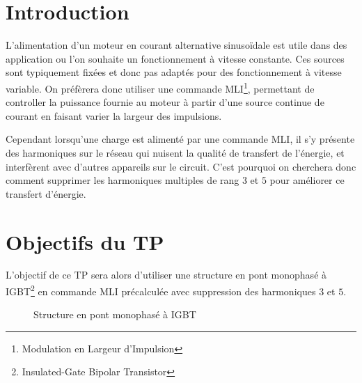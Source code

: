 \documentclass[11pt, openright]{book}
\begin{document}




\vspace{8.5cm}

\section*{Introduction}

L'alimentation d'un moteur en courant alternative sinusoïdale est utile dans des application ou l'on souhaite un fonctionnement à vitesse constante. Ces sources sont typiquement fixées et donc pas adaptés pour des fonctionnement à vitesse variable. On préfèrera donc utiliser une commande MLI\footnote{Modulation en Largeur d'Impulsion}, permettant de controller la puissance fournie au moteur à partir d'une source continue de courant en faisant varier la largeur des impulsions.

Cependant lorsqu'une charge est alimenté par une commande MLI, il s'y présente des harmoniques sur le réseau qui nuisent la qualité de transfert de l'énergie, et interfèrent avec d'autres appareils sur le circuit. C'est pourquoi on cherchera donc comment supprimer les harmoniques multiples de rang $3$ et $5$ pour améliorer ce transfert d'énergie.


\newpage

\section{Objectifs du TP}

L'objectif de ce TP sera alors d'utiliser une structure en pont monophasé à IGBT\footnote{Insulated-Gate Bipolar Transistor} en commande MLI précalculée avec suppression des harmoniques $3$ et $5$.

\begin{figure}[ht!]
	\caption{Structure en pont monophasé à IGBT}
\end{figure}
\end{document}
